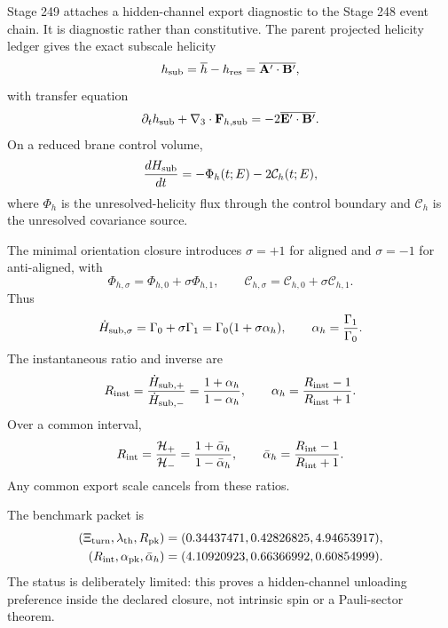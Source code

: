 Stage 249 attaches a hidden-channel export diagnostic to the Stage 248 event chain.  It is diagnostic rather than constitutive.  The parent projected helicity ledger gives the exact subscale helicity
\begin{equation}
\label{eq:part08-stage249-hsub}
h_{\rm sub}
=
\overline h-h_{\rm res}
=
\overline{\mathbf A'\cdot\mathbf B'},
\end{equation}
with transfer equation
\begin{equation}
\label{eq:part08-stage249-hsub-eq}
\partial_th_{\rm sub}+\nabla_3\cdot\mathbf F_{h,{\rm sub}}
=
-2\overline{\mathbf E'\cdot\mathbf B'}.
\end{equation}
On a reduced brane control volume,
\begin{equation}
\label{eq:part08-stage249-hdot}
\frac{dH_{\rm sub}}{dt}
=
-\Phi_h(t;E)-2\mathcal C_h(t;E),
\end{equation}
where \(\Phi_h\) is the unresolved-helicity flux through the control boundary and \(\mathcal C_h\) is the unresolved covariance source.

The minimal orientation closure introduces \(\sigma=+1\) for aligned and \(\sigma=-1\) for anti-aligned, with
\begin{equation}
\label{eq:part08-stage249-orientation-closure}
\Phi_{h,\sigma}=\Phi_{h,0}+\sigma\Phi_{h,1},
\qquad
\mathcal C_{h,\sigma}=\mathcal C_{h,0}+\sigma\mathcal C_{h,1}.
\end{equation}
Thus
\begin{equation}
\label{eq:part08-stage249-export-rate}
\dot H_{{\rm sub},\sigma}
=\Gamma_0+\sigma\Gamma_1
=\Gamma_0(1+\sigma\alpha_h),
\qquad
\alpha_h=\frac{\Gamma_1}{\Gamma_0}.
\end{equation}
The instantaneous ratio and inverse are
\begin{equation}
\label{eq:part08-stage249-instant-ratio}
R_{\rm inst}=\frac{\dot H_{{\rm sub},+}}{\dot H_{{\rm sub},-}}
=\frac{1+\alpha_h}{1-\alpha_h},
\qquad
\alpha_h=\frac{R_{\rm inst}-1}{R_{\rm inst}+1}.
\end{equation}
Over a common interval,
\begin{equation}
\label{eq:part08-stage249-integrated-ratio}
R_{\rm int}
=\frac{\mathcal H_+}{\mathcal H_-}
=\frac{1+\bar\alpha_h}{1-\bar\alpha_h},
\qquad
\bar\alpha_h=\frac{R_{\rm int}-1}{R_{\rm int}+1}.
\end{equation}
Any common export scale cancels from these ratios.

The benchmark packet is
\begin{equation}
\label{eq:part08-stage249-benchmark-packet}
\begin{aligned}
(\Xi_{\rm turn},\lambda_{\rm th},R_{\rm pk})
&=
(0.34437471,0.42826825,4.94653917),\\
(R_{\rm int},\alpha_{\rm pk},\bar\alpha_h)
&=
(4.10920923,0.66366992,0.60854999).
\end{aligned}
\end{equation}
The status is deliberately limited: this proves a hidden-channel unloading preference inside the declared closure, not intrinsic spin or a Pauli-sector theorem.

